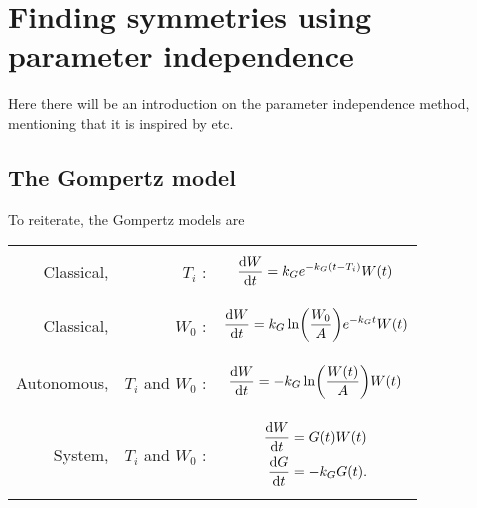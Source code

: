 \chapter{Finding symmetries using parameter independence}

Here there will be an introduction on the parameter independence method, mentioning that it is inspired by \cite{ovsiannikov1982group} etc.

\section{The Gompertz model}
To reiterate, the Gompertz models are\par\noindent
\begin{tabularx}{\linewidth}{rrM}
  Classical, & \(T_i\) :&
  \begin{minipage}{\linewidth}
    \begin{equation}
      \dv{W}{t} = k_G e^{-k_G (t - T_i)} W(t) \label{eq:gompertz-classical-ti}
    \end{equation}
  \end{minipage}\tabularnewline
  Classical, & \(W_0\) :&
  \begin{minipage}{\linewidth}
    \begin{equation}
      \dv{W}{t} = k_G \ln(\frac{W_0}{A})e^{-k_G t} W(t) \label{eq:gompertz-classical-w0}
    \end{equation}
  \end{minipage}\tabularnewline
  Autonomous, & \(T_i\) and \(W_0\) :&
  \begin{minipage}{\linewidth}
    \begin{equation}
      \dv{W}{t} = -k_G \ln(\frac{W(t)}{A}) W(t) \label{eq:gompertz-autonomous}
    \end{equation}
  \end{minipage}\tabularnewline
  System, & \(T_i\) and \(W_0\) :&
  \begin{minipage}{\linewidth}%
    {\begin{subequations}\label{eq:gompertz-system}
      \begin{align}
        \dv{W}{t} &= G(t) W(t) \label{eq:gompertz-system-a}\\
        \dv{G}{t} &= -k_G G(t). \label{eq:gompertz-system-b}
      \end{align}
    \end{subequations}}%
  \end{minipage}
\end{tabularx}

